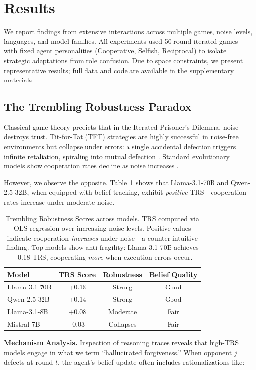 \documentclass{uai2026} %
\begin{document}
\section{Results}\label{sec:results}

We report findings from extensive interactions across multiple games, noise levels, languages, and model families. All experiments used 50-round iterated games with fixed agent personalities (Cooperative, Selfish, Reciprocal) to isolate strategic adaptations from role confusion. Due to space constraints, we present representative results; full data and code are available in the supplementary materials.

\subsection{The Trembling Robustness Paradox}

Classical game theory predicts that in the Iterated Prisoner's Dilemma, noise destroys trust. Tit-for-Tat (TFT) strategies \citep{axelrod1981evolution} are highly successful in noise-free environments but collapse under errors: a single accidental defection triggers infinite retaliation, spiraling into mutual defection \citep{nowak1992tit}. Standard evolutionary models show cooperation rates decline as noise increases \citep{andreoni1993rational}.

However, we observe the opposite. Table~\ref{tab:results} shows that Llama-3.1-70B and Qwen-2.5-32B, when equipped with belief tracking, exhibit \textit{positive} TRS---cooperation rates increase under moderate noise.

\begin{table}[h]
\centering
\begin{tabular}{lccc}
\toprule
\textbf{Model} & \textbf{TRS Score} & \textbf{Robustness}\footnotemark & \textbf{Belief Quality} \\
\midrule
Llama-3.1-70B & +0.18 & Strong & Good \\
Qwen-2.5-32B & +0.14 & Strong & Good \\
Llama-3.1-8B & +0.08 & Moderate & Fair \\
Mistral-7B & -0.03 & Collapses & Fair \\
\bottomrule
\end{tabular}
\caption{Trembling Robustness Scores across models. TRS computed via OLS regression over increasing noise levels. Positive values indicate cooperation \textit{increases} under noise---a counter-intuitive finding. Top models show anti-fragility: Llama-3.1-70B achieves +0.18 TRS, cooperating \textit{more} when execution errors occur.}
\label{tab:results}
\end{table}
\textbf{Mechanism Analysis.} Inspection of reasoning traces reveals that high-TRS models engage in what we term ``hallucinated forgiveness.'' When opponent $j$ defects at round $t$, the agent's belief update often includes rationalizations like:
\end{document}
